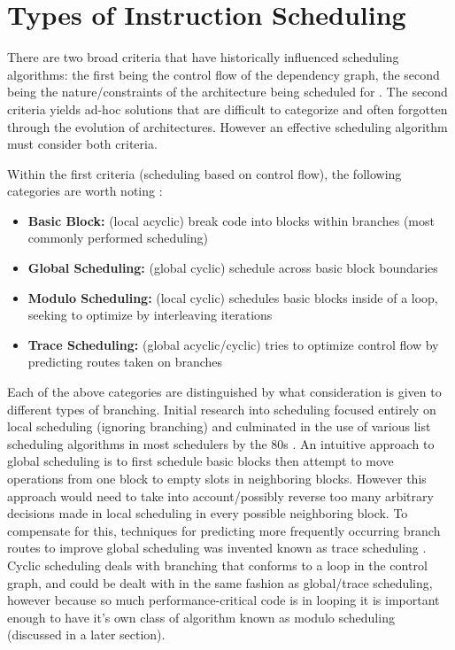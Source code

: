 \documentclass[12pt]{report}
\begin{document}
\section{Types of Instruction Scheduling}
\label{sec:org3d68efc}
There are two broad criteria that have historically influenced scheduling
algorithms: the first being the control flow of the dependency graph, the
second being the nature/constraints of the architecture being scheduled for
\parencite{rau1993instruction}. The second criteria yields ad-hoc solutions
that are difficult to categorize and often forgotten through the evolution of
architectures. However an effective scheduling algorithm must consider both criteria.

Within the first criteria (scheduling based on control flow), the following
categories are worth noting \parencite{rau1993instruction}:
\begin{itemize}
\item \textbf{Basic Block:} (local acyclic) break code into blocks within branches (most commonly performed scheduling)
\item \textbf{Global Scheduling:} (global cyclic) schedule across basic block boundaries
\item \textbf{Modulo Scheduling:} (local cyclic) schedules basic blocks inside of a loop, seeking to
optimize by interleaving iterations
\item \textbf{Trace Scheduling:} (global acyclic/cyclic) tries to optimize control flow by predicting routes
taken on branches
\end{itemize}
Each of the above categories are distinguished by what consideration is given
to different types of branching. Initial research into scheduling focused
entirely on local scheduling (ignoring branching)
\parencite{rau1993instruction} and culminated in the use of various list
scheduling algorithms in most schedulers by the 80s
\parencite{fisher1983very}. An intuitive approach to global scheduling is to
first schedule basic blocks then attempt to move operations from one block to
empty slots in neighboring blocks. However this approach would need to take
into account/possibly reverse too many arbitrary decisions made in local
scheduling in every possible neighboring block. To compensate for this,
techniques for predicting more frequently occurring branch routes to improve
global scheduling was invented known as trace scheduling
\parencite{fisher1981trace}. Cyclic scheduling deals with branching that
conforms to a loop in the control graph, and could be dealt with in the same
fashion as global/trace scheduling, however because so much
performance-critical code is in looping it is important enough to
have it's own class of algorithm known as modulo scheduling (discussed in a
later section).
\end{document}
